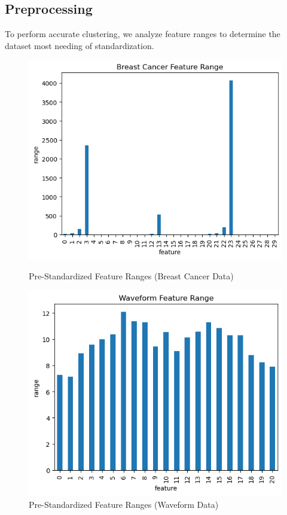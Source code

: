 \documentclass{article}
\begin{document}
\newpage

\subsection{Preprocessing}
To perform accurate clustering, we analyze feature ranges to determine the dataset most needing of standardization.
\begin{figure}[H]
    \centering
    \begin{minipage}[b]{0.49\textwidth}
        \centering
        \includegraphics[width=\textwidth]{p_i.png}
        \caption{Pre-Standardized Feature Ranges (Breast Cancer Data)}
    \end{minipage}
    \hfill
    \begin{minipage}[b]{0.49\textwidth}
        \centering
        \includegraphics[width=\textwidth]{p_ii.png}
        \caption{Pre-Standardized Feature Ranges (Waveform Data)}
    \end{minipage}
\end{figure}
\end{document}
